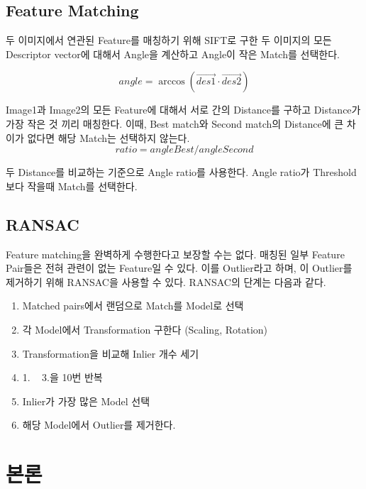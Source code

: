 \documentclass[]{report}
\begin{document}
\section{Feature Matching}

두 이미지에서 연관된 Feature를 매칭하기 위해 SIFT로 구한 두 이미지의 모든 Descriptor vector에 대해서 Angle을 계산하고 Angle이 작은 Match를 선택한다.\

\[ angle = \arccos(\vec{des1} \cdot \vec{des2}) \]

Image1과 Image2의 모든 Feature에 대해서 서로 간의 Distance를 구하고 Distance가 가장 작은 것 끼리 매칭한다.
 이때, Best match와 Second match의 Distance에 큰 차이가 없다면 해당 Match는 선택하지 않는다.\\

 \[ ratio =  angleBest / angleSecond \]
 
 두 Distance를 비교하는 기준으로 Angle ratio를 사용한다. Angle ratio가 Threshold보다 작을때 Match를 선택한다.\\

\section{RANSAC}

Feature matching을 완벽하게 수행한다고 보장할 수는 없다. 매칭된 일부 Feature Pair들은 전혀 관련이 없는 Feature일 수 있다. 
이를 Outlier라고 하며, 이 Outlier를 제거하기 위해 RANSAC을 사용할 수 있다. RANSAC의 단계는 다음과 같다.\\

\begin{enumerate}
	\item Matched pairs에서 랜덤으로 Match를 Model로 선택
	\item 각 Model에서 Transformation 구한다 (Scaling, Rotation)
	\item Transformation을 비교해 Inlier 개수 세기
	\item 1. ~ 3.을 10번 반복
	\item Inlier가 가장 많은 Model 선택
	\item 해당 Model에서 Outlier를 제거한다.\\
\end{enumerate}

\chapter{본론}
\end{document}
